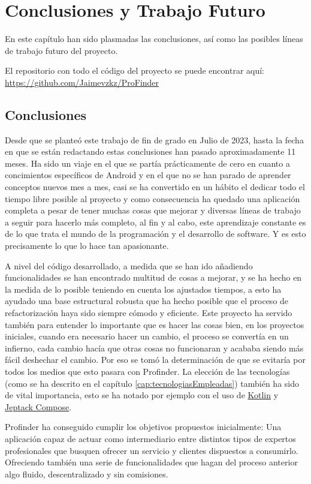 \chapter{Conclusiones y Trabajo Futuro}
\label{cap:conclusiones}
En este capítulo han sido plasmadas las conclusiones, así como las posibles líneas de trabajo futuro del proyecto.

El repositorio con todo el código del proyecto se puede encontrar aquí: \url{https://github.com/Jaimevzkz/ProFinder}

\section{Conclusiones}
Desde que se planteó este trabajo de fin de grado en Julio de 2023, hasta la fecha en que se están redactando estas conclusiones han pasado aproximadamente 11 meses. Ha sido un viaje en el que se partía prácticamente de cero en cuanto a concimientos específicos de Android y en el que no se han parado de aprender conceptos nuevos mes a mes, casi se ha convertido en un hábito el dedicar todo el tiempo libre posible al proyecto y como consecuencia ha quedado una aplicación completa a pesar de tener muchas cosas que mejorar y diversas líneas de trabajo a seguir para hacerlo más completo, al fin y al cabo, este aprendizaje constante es de lo que trata el mundo de la programación y el desarrollo de software. Y es esto precisamente lo que lo hace tan apasionante.

A nivel del código desarrollado, a medida que se han ido añadiendo funcionalidades se han encontrado multitud de cosas a mejorar, y se ha hecho en la medida de lo posible teniendo en cuenta los ajustados tiempos, a esto ha ayudado una base estructural robusta que ha hecho posible que el proceso de refactorización haya sido siempre cómodo y eficiente. Este proyecto ha servido también para entender lo importante que es hacer las cosas bien, en los proyectos iniciales, cuando era necesario hacer un cambio, el proceso se convertía en un infierno, cada cambio hacía que otras cosas no funcionaran y acababa siendo más fácil deshechar el cambio. Por eso se tomó la determinación de que se evitaría por todos los medios que esto pasara con Profinder. La elección de las tecnologías (como se ha descrito en el capítulo \ref{cap:tecnologiasEmpleadas}) también ha sido de vital importancia, esto se ha notado por ejemplo con el uso de \hyperlink{subsec:kotlin}{Kotlin} y \hyperlink{subsec:compose}{Jeptack Compose}.

Profinder ha conseguido cumplir los objetivos propuestos inicialmente: Una aplicación capaz de actuar como intermediario entre distintos tipos de expertos profesionales que busquen ofrecer un servicio y clientes dispuestos a consumirlo. Ofreciendo también una serie de funcionalidades que hagan del proceso anterior algo fluido, descentralizado y sin comisiones.

